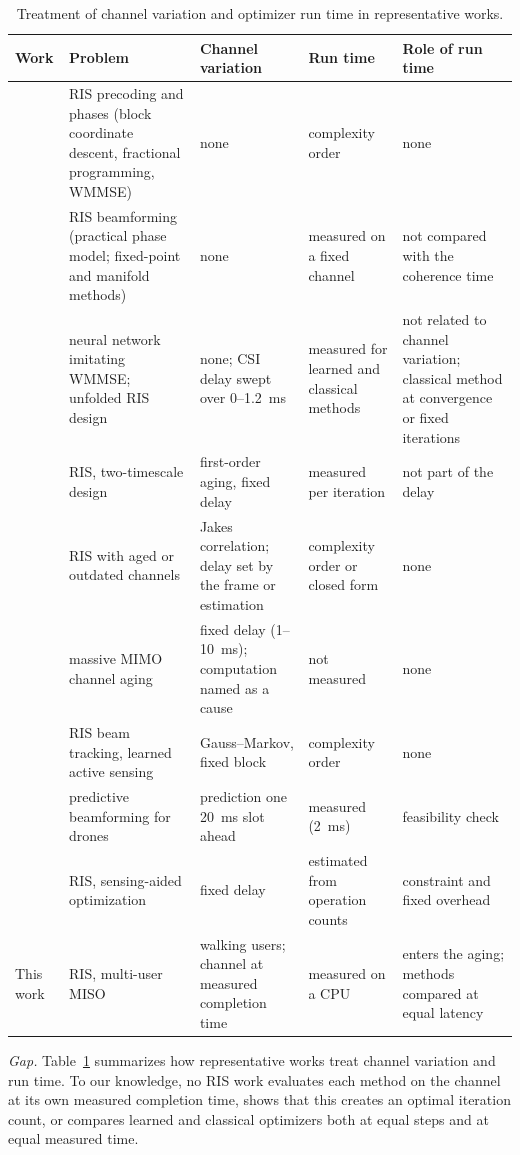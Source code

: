 \begin{table}[t]
\caption{Treatment of channel variation and optimizer run time in representative works.}
\label{tab:literature}
\footnotesize
\setlength{\tabcolsep}{4pt}
\begin{tabular}{@{}>{\raggedright\arraybackslash}p{}>{\raggedright\arraybackslash}p{}>{\raggedright\arraybackslash}p{}>{\raggedright\arraybackslash}p{}>{\raggedright\arraybackslash}p{}@{}}
\toprule
Work & Problem & Channel variation & Run time & Role of run time \\
\midrule
\cite{Pan2020TWC,Guo2020TWC,Choi2024TCOM} & RIS precoding and phases (block coordinate descent, fractional programming, WMMSE) & none & complexity order & none \\
\cite{Abeywickrama2020TCOM,Yu2019ICCC} & RIS beamforming (practical phase model; fixed-point and manifold methods) & none & measured on a fixed channel & not compared with the coherence time \\
\cite{Sun2018TSP,Liu2022TWC} & neural network imitating WMMSE; unfolded RIS design & none; CSI delay swept over 0--1.2~ms~\cite{Liu2022TWC} & measured for learned and classical methods & not related to channel variation; classical method at convergence or fixed iterations \\
\cite{Cao2022TWC} & RIS, two-timescale design & first-order aging, fixed delay & measured per iteration & not part of the delay \\
\cite{Papazafeiropoulos2023TVT,Zhang2022TCOM} & RIS with aged or outdated channels & Jakes correlation; delay set by the frame or estimation & complexity order or closed form & none \\
\cite{Truong2013JCN} & massive MIMO channel aging & fixed delay (1--10~ms); computation named as a cause & not measured & none \\
\cite{Han2025TWC} & RIS beam tracking, learned active sensing & Gauss--Markov, fixed block & complexity order & none \\
\cite{Liu2021WCL} & predictive beamforming for drones & prediction one 20~ms slot ahead & measured (2~ms) & feasibility check \\
\cite{Ryu2026arXiv} & RIS, sensing-aided optimization & fixed delay & estimated from operation counts & constraint and fixed overhead \\
This work & RIS, multi-user MISO & walking users; channel at measured completion time & measured on a CPU & enters the aging; methods compared at equal latency \\
\bottomrule
\end{tabular}
\end{table}

\emph{Gap.} Table~\ref{tab:literature} summarizes how representative works treat channel variation and run time. To our knowledge, no RIS work evaluates each method on the channel at its own measured completion time, shows that this creates an optimal iteration count, or compares learned and classical optimizers both at equal steps and at equal measured time.
